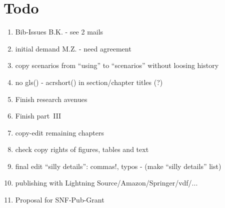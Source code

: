 \section*{Todo}

\begin{enumerate}\styleEnumerate

\item Bib-Issues B.K. - see 2 mails

\item initial demand M.Z. - need agreement

\item copy scenarios from ``using'' to ``scenarios'' without loosing history

\item no gls() - acrshort() in section/chapter titles (?)

\item Finish research avenues

\item Finish part~III

\item copy-edit remaining chapters

\item check copy rights of figures, tables and text

\item final edit ``silly details'': commas!, typos - (make ``silly details'' list)

\item publishing with Lightning Source/Amazon/Springer/vdf/...

\item Proposal for SNF-Pub-Grant







\end{enumerate}
